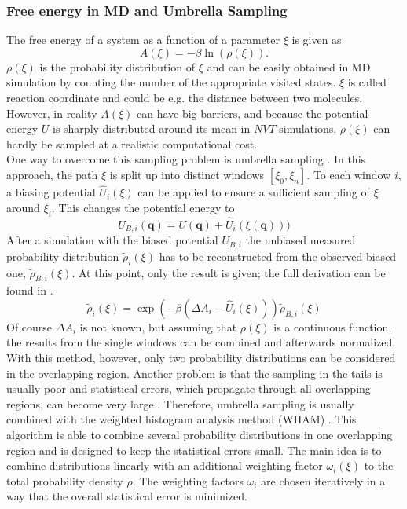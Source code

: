 \subsubsection{Free energy in MD and Umbrella Sampling}
The free energy of a system as a function of a parameter $\xi$ is given as
\begin{equation}
\label{eq:free_energy_from_rho}
A(\xi) = - \beta \ln\left(\rho(\xi)\right).
\end{equation}
$\rho(\xi)$ is the probability distribution of $\xi$ and can be easily obtained in MD simulation by counting the number of the appropriate visited states. $\xi$ is called reaction coordinate and could be e.g. the distance between two molecules. However, in reality $A(\xi)$ can have big barriers, and because the potential energy $U$ is sharply distributed around its mean in $NVT$ simulations, $\rho(\xi)$ can hardly be sampled at a realistic computational cost.\\
One way to overcome this sampling problem is umbrella sampling \autocite{originalUmbrellaSampling}. In this approach, the path $\xi$ is split up into distinct windows $[\xi_0, \xi_n]$. To each window $i$, a biasing potential $\hat{U}_i(\xi)$ can be applied to ensure a sufficient sampling of $\xi$ around $\xi_i$. This changes the potential energy to
\begin{equation}
U_{B, i}(\mathbf{q}) = U(\mathbf{q}) + \hat{U}_i(\xi(\mathbf{q})))
\end{equation}
After a simulation with the biased potential $U_{B, i}$ the unbiased measured probability distribution $\tilde{\rho}_i(\xi)$ has to be reconstructed from the observed biased one, $\tilde{\rho}_{B, i}(\xi)$. At this point, only the result is given; the full derivation can be found in \textcite[p. 179-181]{UnderstandingMD}.\\
 \begin{equation}
 \label{eq:reconstruction_from_biased}
 \tilde{\rho}_{i}(\xi) = \exp\left(-\beta\left(\Delta A_i - \hat{U}_i(\xi)\right)\right)\tilde{\rho}_{B, i}(\xi)
 \end{equation}
Of course $\Delta A_i$ is not known, but assuming that $\rho(\xi)$ is a continuous function, the results from the single windows can be combined and afterwards normalized.\\
With this method, however, only two probability distributions can be considered in the overlapping region. Another problem is that the sampling in the tails is usually poor and statistical errors, which propagate through all overlapping regions, can become very large \autocite[236-238]{freeEnergyBook}. Therefore, umbrella sampling is usually combined with the weighted histogram analysis method (WHAM) \autocites{originalWHAM, extensionWHAM}. This algorithm is able to combine several probability distributions in one overlapping region and is designed to keep the statistical errors small. The main idea is to combine distributions linearly with an additional weighting factor $\omega_i(\xi)$ to the total probability density $\tilde{\rho}$. The weighting factors $\omega_i$ are chosen iteratively in a way that the overall statistical error is minimized.\\
